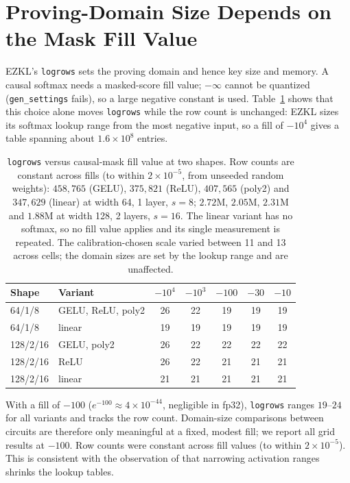 \documentclass[10pt]{article}
\begin{document}
\section{Proving-Domain Size Depends on the Mask Fill Value}
\label{sec:domain}

EZKL's \texttt{logrows} sets the proving domain and hence key size and memory.
A causal softmax needs a masked-score fill value; $-\infty$ cannot be quantized
(\texttt{gen\_settings} fails), so a large negative constant is used.
Table~\ref{tab:fill} shows that this choice alone moves \texttt{logrows} while
the row count is unchanged: EZKL sizes its softmax lookup range from the most
negative input, so a fill of $-10^4$ gives a table spanning about $1.6\times10^8$
entries.

\begin{table}[t]
\centering
\caption{\texttt{logrows} versus causal-mask fill value at two shapes. Row counts
  are constant across fills (to within $2\times10^{-5}$, from unseeded random
  weights): $458{,}765$ (GELU), $375{,}821$ (ReLU), $407{,}565$ (poly2) and
  $347{,}629$ (linear) at width 64, 1 layer, $s{=}8$; $2.72$M, $2.05$M, $2.31$M
  and $1.88$M at width 128, 2 layers, $s{=}16$. The linear variant has no softmax, so no
  fill value applies and its single measurement is repeated. The
  calibration-chosen scale varied between 11 and 13 across cells; the domain sizes
  are set by the lookup range and are unaffected.}
\label{tab:fill}
\begin{tabular}{llccccc}
\toprule
Shape & Variant & $-10^4$ & $-10^3$ & $-100$ & $-30$ & $-10$ \\
\midrule
64/1/8 & GELU, ReLU, poly2 & 26 & 22 & 19 & 19 & 19 \\
64/1/8 & linear & 19 & 19 & 19 & 19 & 19 \\
128/2/16 & GELU, poly2 & 26 & 22 & 22 & 22 & 22 \\
128/2/16 & ReLU & 26 & 22 & 21 & 21 & 21 \\
128/2/16 & linear & 21 & 21 & 21 & 21 & 21 \\
\bottomrule
\end{tabular}
\end{table}

With a fill of $-100$ ($e^{-100}\approx4\times10^{-44}$, negligible in fp32), \texttt{logrows}
ranges $19$--$24$ for all variants and tracks the row count. Domain-size
comparisons between circuits are therefore only meaningful at a fixed,
modest fill; we report all grid results at $-100$. Row counts were constant
across fill values (to within $2\times10^{-5}$). This is consistent with the
observation of \citet{telescarse2025} that narrowing activation ranges shrinks
the lookup tables.
\end{document}
